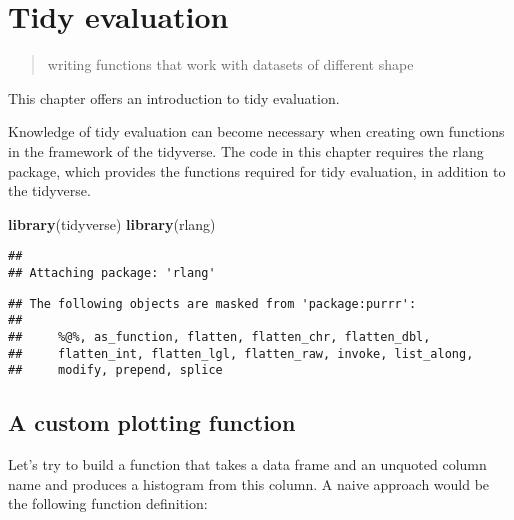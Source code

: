 \documentclass[]{book}
\newenvironment{Shaded}{\begin{snugshade}}{\end{snugshade}}
\newcommand{\ControlFlowTok}[1]{\textcolor[rgb]{0.13,0.29,0.53}{\textbf{#1}}}
\newcommand{\DataTypeTok}[1]{\textcolor[rgb]{0.13,0.29,0.53}{#1}}
\newcommand{\KeywordTok}[1]{\textcolor[rgb]{0.13,0.29,0.53}{\textbf{#1}}}
\newcommand{\NormalTok}[1]{#1}
\newcommand{\OperatorTok}[1]{\textcolor[rgb]{0.81,0.36,0.00}{\textbf{#1}}}
\newcommand{\StringTok}[1]{\textcolor[rgb]{0.31,0.60,0.02}{#1}}
\begin{document}
\hypertarget{tidy-evaluation}{%
\chapter{Tidy evaluation}\label{tidy-evaluation}}

\begin{quote}
writing functions that work with datasets of different shape
\end{quote}

This chapter offers an introduction to tidy evaluation.

Knowledge of tidy evaluation can become necessary when creating own functions in the framework of the tidyverse.
The code in this chapter requires the rlang package, which provides the functions required for tidy evaluation, in addition to the tidyverse.

\begin{Shaded}
\begin{Highlighting}[]
\KeywordTok{library}\NormalTok{(tidyverse)}
\KeywordTok{library}\NormalTok{(rlang)}
\end{Highlighting}
\end{Shaded}

\begin{verbatim}
## 
## Attaching package: 'rlang'
\end{verbatim}

\begin{verbatim}
## The following objects are masked from 'package:purrr':
## 
##     %@%, as_function, flatten, flatten_chr, flatten_dbl,
##     flatten_int, flatten_lgl, flatten_raw, invoke, list_along,
##     modify, prepend, splice
\end{verbatim}

\hypertarget{colname}{%
\section{A custom plotting function}\label{colname}}

Let's try to build a function that takes a data frame and an unquoted column name and produces a histogram from this column.
A naive approach would be the following function definition:

\begin{Shaded}
\end{Shaded}
\end{document}
